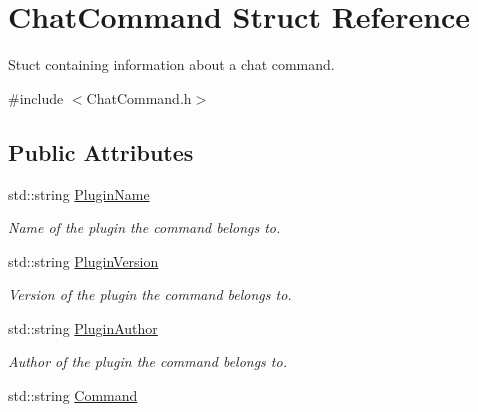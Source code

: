 \hypertarget{structChatCommand}{\section{Chat\-Command Struct Reference}
\label{structChatCommand}
}


Stuct containing information about a chat command.  




{\ttfamily \#include $<$Chat\-Command.\-h$>$}

\subsection*{Public Attributes}
\begin{DoxyCompactItemize}
\item 
\hypertarget{structChatCommand_aa1858f17632079a61dbae6fdfc0db3f7}{std\-::string \hyperlink{structChatCommand_aa1858f17632079a61dbae6fdfc0db3f7}{Plugin\-Name}}\label{structChatCommand_aa1858f17632079a61dbae6fdfc0db3f7}

\begin{DoxyCompactList}\small\item\em Name of the plugin the command belongs to. \end{DoxyCompactList}\item 
\hypertarget{structChatCommand_a68a18179fcd0f8a4349843ea0e082c66}{std\-::string \hyperlink{structChatCommand_a68a18179fcd0f8a4349843ea0e082c66}{Plugin\-Version}}\label{structChatCommand_a68a18179fcd0f8a4349843ea0e082c66}

\begin{DoxyCompactList}\small\item\em Version of the plugin the command belongs to. \end{DoxyCompactList}\item 
\hypertarget{structChatCommand_ad82ece9647207fcfba2a9288d9ff0528}{std\-::string \hyperlink{structChatCommand_ad82ece9647207fcfba2a9288d9ff0528}{Plugin\-Author}}\label{structChatCommand_ad82ece9647207fcfba2a9288d9ff0528}

\begin{DoxyCompactList}\small\item\em Author of the plugin the command belongs to. \end{DoxyCompactList}\item 
\hypertarget{structChatCommand_af7f073123a46cbe3873299cf2410f022}{std\-::string \hyperlink{structChatCommand_af7f073123a46cbe3873299cf2410f022}{Command}}\label{structChatCommand_af7f073123a46cbe3873299cf2410f022}


\end{DoxyCompactItemize}
